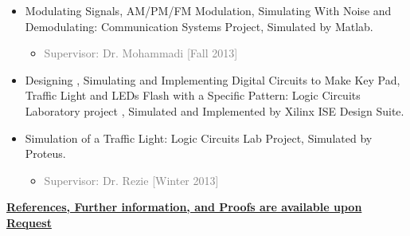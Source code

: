 \documentclass[10pt,a4paper,sans]{moderncv} %
\begin{document}
\begin{itemize}
\begin{itemize}
		\item Modulating Signals, AM/PM/FM Modulation, Simulating With Noise and Demodulating: Communication Systems Project, Simulated by Matlab.
		\begin{itemize}
		\item \textcolor{gray}{Supervisor: Dr. Mohammadi [Fall 2013]}
		\end{itemize}
		
		\item Designing , Simulating and Implementing Digital Circuits to Make Key Pad, Traffic Light and LEDs Flash with a Specific Pattern: Logic Circuits Laboratory project , Simulated and Implemented by Xilinx ISE Design Suite.
		
		\item Simulation of a Traffic Light: Logic Circuits Lab Project, Simulated by Proteus.
		\begin{itemize}
		\item \textcolor{gray}{Supervisor: Dr. Rezie [Winter 2013] \\}
		\end{itemize}
		
	\end{itemize}
\end{itemize}




\vspace{-0em}
\centerline{\underline{\textbf{	\faExclamationCircle \hspace{0.5 pt} References, Further information, and Proofs are available upon Request}}}
\end{document}
